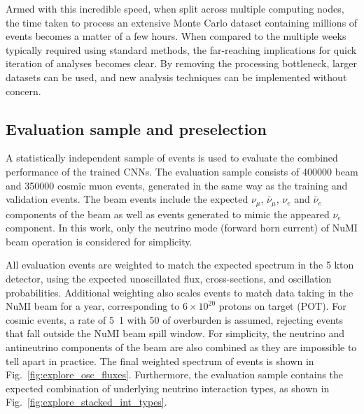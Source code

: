 Armed with this incredible speed, when split across multiple computing nodes, the time taken to
process an extensive Monte Carlo dataset containing millions of events becomes a matter of a few
hours. When compared to the multiple weeks typically required using standard methods, the
far-reaching implications for quick iteration of analyses becomes clear. By removing the
processing bottleneck, larger datasets can be used, and new analysis techniques can be implemented
without concern.

\subsection{Evaluation sample and preselection} %
\label{sec:cvn_results_sample} %

A statistically independent sample of events is used to evaluate the combined performance of the
trained CNNs. The evaluation sample consists of 400000 beam and 350000 cosmic muon events,
generated in the same way as the training and validation events. The beam events include the
expected $\nu_{\mu}$, $\bar{\nu}_{\mu}$, $\nu_{e}$ and $\bar{\nu}_{e}$ components of the beam as
well as events generated to mimic the appeared $\nu_{e}$ component. In this work, only the
neutrino mode (forward horn current) of NuMI beam operation is considered for simplicity.

All evaluation events are weighted to match the expected spectrum in the 5 kton \chipsfive
detector, using the expected unoscillated flux, cross-sections, and oscillation probabilities.
Additional weighting also scales events to match data taking in the NuMI beam for a year,
corresponding to $6\times 10^{20}$ protons on target (POT). For cosmic events, a rate of
\unit{5.1}{} with \unit{50}{} of overburden is assumed, rejecting events
that fall outside the NuMI beam spill window. For simplicity, the neutrino and antineutrino
components of the beam are also combined as they are impossible to tell apart in practice. The
final weighted spectrum of events is shown in Fig.~\ref{fig:explore_osc_fluxes}. Furthermore, the
evaluation sample contains the expected combination of underlying neutrino interaction types, as
shown in Fig.~\ref{fig:explore_stacked_int_types}.

